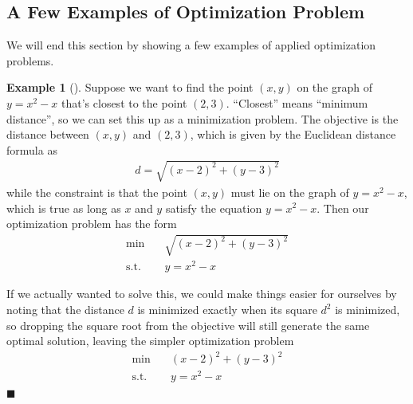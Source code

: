 \documentclass[11pt]{article}
\theoremstyle{definition} %
\newtheorem{ex}{Example}[section] %
\newenvironment{example}[1][]{\begin{ex}[#1]}{\hfill$\blacksquare$\end{ex}} %
\begin{document}
\subsection{A Few Examples of Optimization Problem}
\label{subsec:examples}

We will end this section by showing a few examples of applied optimization problems.

\begin{example}
\label{ex:distance}
	Suppose we want to find the point $(x,y)$ on the graph of $y = x^2 - x$ that's closest to the point $(2,3)$. ``Closest'' means ``minimum distance'', so we can set this up as a minimization problem. The objective is the distance between $(x,y)$ and $(2,3)$, which is given by the Euclidean distance formula as
	\begin{align*}
		d = \sqrt{(x-2)^2 + (y-3)^2}
	\end{align*}
	while the constraint is that the point $(x,y)$ must lie on the graph of $y = x^2 - x$, which is true as long as $x$ and $y$ satisfy the equation $y = x^2 - x$. Then our optimization problem has the form
	\begin{align*}
		\min \quad& \sqrt{(x-2)^2 + (y-3)^2} \\
		\mathrm{s.t.} \quad& y = x^2 - x
	\end{align*}
	
	If we actually wanted to solve this, we could make things easier for ourselves by noting that the distance $d$ is minimized exactly when its square $d^2$ is minimized, so dropping the square root from the objective will still generate the same optimal solution, leaving the simpler optimization problem
	\begin{align*}
		\min \quad& (x-2)^2 + (y-3)^2 \\
		\mathrm{s.t.} \quad& y = x^2 - x
	\end{align*}
\end{example}
\end{document}
